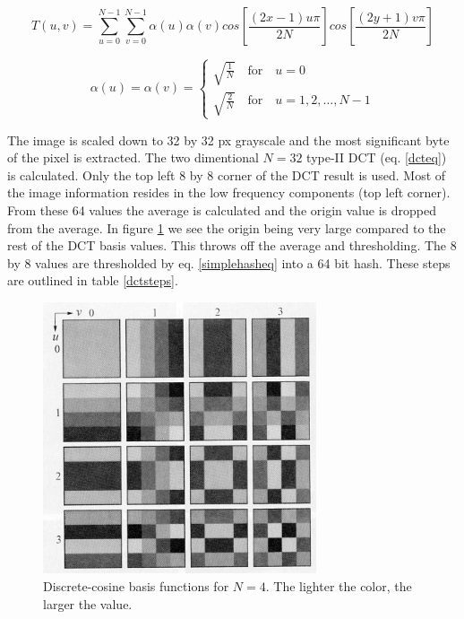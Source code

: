 \documentclass[english,12pt,a4paper,pdftex,elec,utf8]{aaltothesis}
\begin{document}
\begin{equation}\label{dcteq}
T(u,v)= \sum_{u=0}^{N-1} \sum_{v=0}^{N-1}\alpha(u)\alpha(v)cos\left[\frac{(2x-1)u\pi}{2N}\right]cos\left[\frac{(2y + 1)v\pi}{2N}\right]
\end{equation}

\begin{equation}\label{dctcoefeq}
  \alpha(u) = \alpha(v)= \begin{cases}
    \sqrt{\frac{1}{N}} \quad \textrm{for} \quad u=0\\
    \sqrt{\frac{2}{N}} \quad \textrm{for} \quad u=1,2,\ldots,N-1
    \end{cases}
\end{equation}

The image is scaled down to 32 by 32 px grayscale and the most significant byte of the pixel is extracted. The two dimentional $N=32$ type-II DCT (eq. \ref{dcteq}) is calculated. Only the top left 8 by 8 corner of the DCT result is used. Most of the image information resides in the low frequency components (top left corner). From these 64 values the average is calculated and the origin value is dropped from the average. In figure \ref{dctkernels} we see the origin being very large compared to the rest of the DCT basis values. This throws off the average and thresholding. The 8 by 8 values are thresholded by eq. \ref{simplehasheq} into a 64 bit hash. These steps are outlined in table \ref{dctsteps}.

\begin{figure}[htb]
\begin{center}
\includegraphics[height=8cm]{figures/dct}
\end{center}
\caption{Discrete-cosine basis functions for $N = 4$. The lighter the color, the larger the value. \cite[p. 473]{Gonzalez2002}}
\label{dctkernels}
\end{figure}
\end{document}
